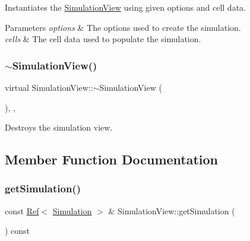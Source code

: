 Instantiates the \mbox{\hyperlink{class_simulation_view}{Simulation\+View}} using given options and cell data. 


\begin{DoxyParams}{Parameters}
{\em options} & The options used to create the simulation.\\
\hline
{\em cells} & The cell data used to populate the simulation.\\
\hline
\end{DoxyParams}
\mbox{\label{class_simulation_view_ad10f4de06a743fb8919f2be1e6585210}} 
\subsubsection{\texorpdfstring{$\sim$SimulationView()}{~SimulationView()}}
{\footnotesize\ttfamily virtual Simulation\+View\+::$\sim$\+Simulation\+View (\begin{DoxyParamCaption}{ }\end{DoxyParamCaption})\hspace{0.3cm}{\ttfamily [inline]}, {\ttfamily [override]}, {\ttfamily [virtual]}}



Destroys the simulation view. 



\subsection{Member Function Documentation}
\mbox{\label{class_simulation_view_a3a1483e1750ad6251ea1cff1f39dcefa}} 
\subsubsection{\texorpdfstring{getSimulation()}{getSimulation()}}
{\footnotesize\ttfamily const \mbox{\hyperlink{class_ref}{Ref}}$<$ \mbox{\hyperlink{class_simulation}{Simulation}} $>$ \& Simulation\+View\+::get\+Simulation (\begin{DoxyParamCaption}{ }\end{DoxyParamCaption}) const}



